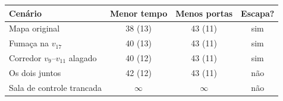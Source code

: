 \begin{tabular}{lccc}
\toprule
Cenário & Menor tempo & Menos portas & Escapa? \\
\midrule
Mapa original & 38 (13) & 43 (11) & sim \\
Fumaça na $v_{17}$ & 40 (13) & 43 (11) & sim \\
Corredor $v_9$--$v_{11}$ alagado & 40 (12) & 43 (11) & sim \\
Os dois juntos & 42 (12) & 43 (11) & não \\
Sala de controle trancada & $\infty$ & $\infty$ & não \\
\bottomrule
\end{tabular}
